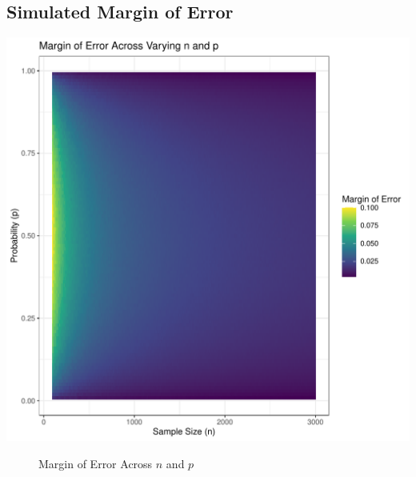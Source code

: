 \documentclass{article}\usepackage[]{graphicx}\usepackage[]{xcolor}
\makeatletter
\def\maxwidth{ %
  \ifdim\Gin@nat@width>\linewidth
    \linewidth
  \else
    \Gin@nat@width
  \fi
}
\newenvironment{knitrout}{}{} %
\makeatother
\begin{document}
\subsection{Simulated Margin of Error}
\begin{knitrout}\scriptsize
{}\color{fgcolor}
\includegraphics[width=\maxwidth]{figure/plot3-1} 
\end{knitrout}

\begin{figure}[H]
\begin{center}

\caption{Margin of Error Across $n$ and $p$}
\label{moeovernandp} %
\end{center}
\end{figure}

\pagebreak
\end{document}
